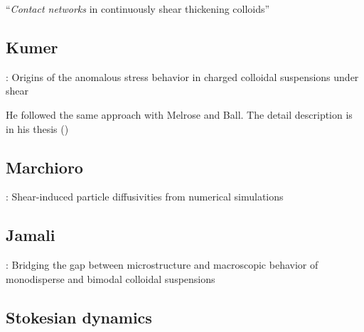 \documentclass[11pt]{scrartcl}
\begin{document}
\citet{Melrose_2004}
``\emph{Contact networks} in continuously shear thickening colloids''


\subsection*{Kumer}

\citet{Kumar_2010}:
Origins of the anomalous stress behavior in charged colloidal suspensions under shear

He followed the same approach with Melrose and Ball.
The detail description is in his thesis (\citet{Kumar_2010a})

\subsection*{Marchioro}

\citet{Marchioro_2001}:
Shear-induced particle diffusivities from numerical simulations

\subsection*{Jamali}

\citet{Jamali_2013}:
Bridging the gap between microstructure and macroscopic behavior of 
monodisperse and bimodal colloidal suspensions


\subsection*{Stokesian dynamics}
\end{document}
